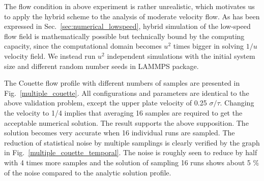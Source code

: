 \documentclass[preprint,12pt]{elsarticle}
\begin{document}




The flow condition in above experiment is rather unrealistic, which motivates us to apply the hybrid scheme to the analysis of moderate velocity flow. As has been expressed in Sec.~\ref{sec:numerical_lowspeed}, hybrid simulation of the low-speed flow field is mathematically possible but technically bound by the computing capacity, since the computational domain becomes $u^2$ times bigger in solving $1/u$ velocity field. We instead run $u^2$ independent simulations with the initial system size and different random number seeds in LAMMPS package. %


The Couette flow profile with different numbers of samples are presented in Fig.~\ref{multiple_couette}. All configurations and parameters are identical to the above validation problem, except the upper plate velocity of 0.25 $\sigma/\tau$. Changing the velocity to 1/4 implies that averaging 16 samples are required to get the acceptable numerical solution. The result supports the above supposition. The solution becomes very accurate when 16 individual runs are sampled. The reduction of statistical noise by multiple samplings is clearly verified by the graph in Fig.~\ref{multiple_couette_temporal}. The noise is roughly seen to reduce by half with 4 times more samples and the solution of sampling 16 runs shows about 5 $\%$ of the noise compared to the analytic solution profile.
\end{document}
